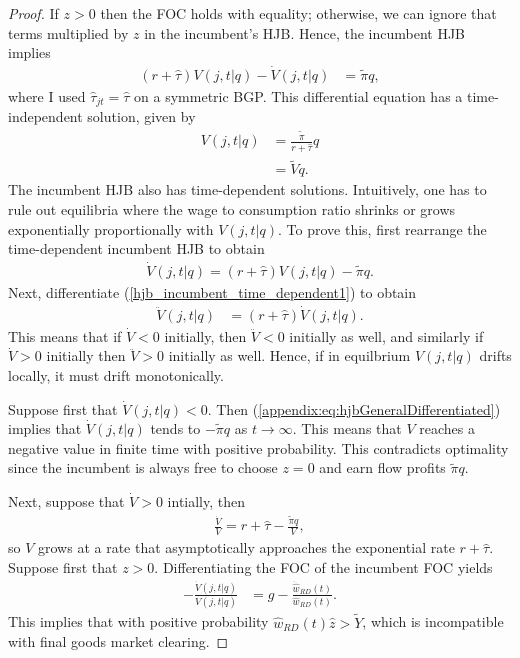 \documentclass[ecta,nameyear,final]{econsocart}
\theoremstyle{definition}
\begin{document}
\begin{proof}
	If $z > 0$ then the FOC holds with equality; otherwise, we can ignore that terms multiplied by $z$ in the incumbent's HJB. Hence, the incumbent HJB implies
	\begin{align}
	(r + \hat{\tau}) V(j,t|q) - \dot{V}(j,t|q) &= \tilde{\pi} q, 
	\label{hjb_incumbent_time_dependent}
	\end{align}
	where I used $\hat{\tau}_{jt} = \hat{\tau}$ on a symmetric BGP. This differential equation has a time-independent solution, given by 
	\begin{align}
	V(j,t|q) &= \frac{\tilde{\pi} }{r + \hat{\tau}}  q\\
	&= \tilde{V} q.
	\end{align}
	The incumbent HJB also has time-dependent solutions. Intuitively, one has to rule out equilibria  where the wage to consumption ratio shrinks or grows exponentially proportionally with $V(j,t|q)$. To prove this, first rearrange the time-dependent incumbent HJB to obtain
	\begin{align}
		\dot{V}(j,t|q) = (r + \hat{\tau}) V(j,t|q) - \tilde{\pi} q. \label{hjb_incumbent_time_dependent1}
	\end{align} 
	Next, differentiate (\ref{hjb_incumbent_time_dependent1}) to obtain
	\begin{align}
		\ddot{V}(j,t|q) &= (r + \hat{\tau}) \dot{V}(j,t|q). \label{appendix:eq:hjbGeneralDifferentiated}
	\end{align}
	This means that if $\dot{V} < 0$ initially, then $\ddot{V} < 0$ initially as well, and similarly if $\dot{V} > 0$ initially then $\ddot{V} > 0$ initially as well. Hence, if in equilbrium $V(j,t|q)$ drifts locally, it must drift monotonically. 
	
	Suppose first that $\dot{V}(j,t|q) < 0$. Then (\ref{appendix:eq:hjbGeneralDifferentiated}) implies that $\dot{V}(j,t|q)$ tends to $-\tilde{\pi}q$ as $t \to \infty$. This means that $V$ reaches a negative value in finite time with positive probability. This contradicts optimality since the incumbent is always free to choose $z = 0$ and earn flow profits $\tilde{\pi} q$.
	
	Next, suppose that $\dot{V} > 0$ intially, then 
	\begin{align}
		\frac{\dot{V}}{V} = r + \hat{\tau} - \frac{\tilde{\pi} q}{V},
	\end{align}
	so $V$ grows at a rate that asymptotically approaches the exponential rate $r + \hat{\tau}$. Suppose first that $z > 0$. Differentiating the FOC of the incumbent FOC yields
	\begin{align}
		-\frac{\dot{V}(j,t|q)}{V(j,t|q)} &= g - \frac{\dot{\hat{w}}_{RD}(t)}{\hat{w}_{RD}(t)}. \label{appendix:eq:freeEntryDifferentiatedImplication}
	\end{align}
	This implies that with positive probability $\hat{w}_{RD}(t) \hat{z} > \tilde{Y}$, which is incompatible with final goods market clearing. 
	

\end{proof}
\end{document}
